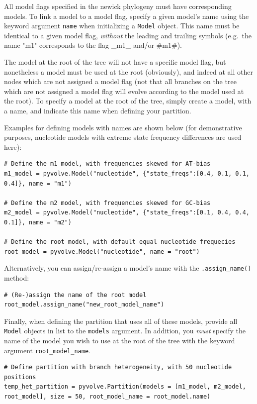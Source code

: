 \documentclass{article}
\newcommand{\code}[1]{\texttt{\small{#1}}}
\begin{document}
All model flags specified in the newick phylogeny must have corresponding models. To link a model to a model flag, specify a given model's name using the keyword argument \code{name} when initializing a \code{Model} object. This name must be identical to a given model flag, \emph{without} the leading and trailing symbols (e.g.\ the name "m1" corresponds to the flag \_m1\_ and/or \#m1\#).

The model at the root of the tree will not have a specific model flag, but nonetheless a model must be used at the root (obviously), and indeed at all other nodes which are not assigned a model flag (not that all branches on the tree which are not assigned a model flag will evolve according to the model used at the root). To specify a model at the root of the tree, simply create a model, with a name, and indicate this name when defining your partition.

Examples for defining models with names are shown below (for demonstrative purposes, nucleotide models with extreme state frequency differences are used here):
\begin{lstlisting}
# Define the m1 model, with frequencies skewed for AT-bias
m1_model = pyvolve.Model("nucleotide", {"state_freqs":[0.4, 0.1, 0.1, 0.4]}, name = "m1")

# Define the m2 model, with frequencies skewed for GC-bias
m2_model = pyvolve.Model("nucleotide", {"state_freqs":[0.1, 0.4, 0.4, 0.1]}, name = "m2")

# Define the root model, with default equal nucleotide frequecies
root_model = pyvolve.Model("nucleotide", name = "root")
\end{lstlisting}

Alternatively, you can assign/re-assign a model's name with the \code{.assign\_name()} method:
\begin{lstlisting}
# (Re-)assign the name of the root model
root_model.assign_name("new_root_model_name")
\end{lstlisting}



Finally, when defining the partition that uses all of these models, provide all \code{Model} objects in list to the \code{models} argument. In addition, you \emph{must} specify the name of the model you wish to use at the root of the tree with the keyword argument \code{root\_model\_name}.
\begin{lstlisting}
# Define partition with branch heterogeneity, with 50 nucleotide positions
temp_het_partition = pyvolve.Partition(models = [m1_model, m2_model, root_model], size = 50, root_model_name = root_model.name)
\end{lstlisting}
\end{document}
